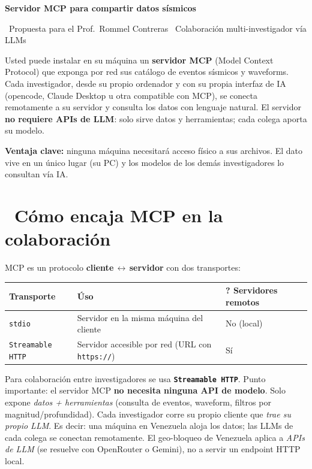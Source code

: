 \documentclass[11pt,a4paper]{article}
\newcommand{\iconoBanda}{microchip}
\newcommand{\bandaTitulo}[3][fondoOscuro]{%
  \begin{tcolorbox}[
    enhanced,
    colback=#1, colframe=#1,
    boxrule=0pt, arc=8pt, outer arc=8pt,
    width=\linewidth,
    top=18pt, bottom=6pt, left=14pt, right=14pt,
    borderline south={3.5pt}{0pt}{cyanNeon},
  ]
    \begin{minipage}[c]{0.07\linewidth}
      \centering
      \textcolor{cyanNeon}{\fontsize{30}{30}\selectfont\faIcon{\iconoBanda}}
    \end{minipage}%
    \hspace{8pt}%
    \begin{minipage}[c]{0.88\linewidth}
      {\fontsize{20}{24}\selectfont\bfseries\color{white}#2}\par\vspace{5pt}%
      \textcolor{cyanNeon!80!white}{\small\faIcon{angle-right}~#3}%
    \end{minipage}
    \vspace{4pt}
  \end{tcolorbox}%
  \vspace{8pt}%
}
\newcommand{\iconotexto}[2]{\textcolor{cyanNeon}{\faIcon{#1}}~#2}
\begin{document}
\renewcommand{\iconoBanda}{satellite}
\bandaTitulo[verdeTurquesa]{Servidor MCP para compartir datos s\'ismicos}{Propuesta para el Prof.\ Rommel Contreras \textbullet\ Colaboraci\'on multi-investigador v\'ia LLMs}

\vspace{6pt}
\begin{tcolorbox}[tarjetaIcono, title={\faIcon{user-graduate}~Resumen para el Prof.\ Rommel}]
Usted puede instalar en su m\'aquina un \textbf{servidor MCP} (Model Context Protocol) que exponga
por red sus cat\'alogo de eventos s\'ismicos y waveforms. Cada investigador, desde su propio
ordenador y con su propia interfaz de IA (opencode, Claude Desktop u otra compatible con MCP),
se conecta remotamente a su servidor y consulta los datos con lenguaje natural. El servidor
\textbf{no requiere APIs de LLM}: solo sirve datos y herramientas; cada colega aporta su modelo.

\medskip
\textbf{Ventaja clave:} ninguna m\'aquina necesitar\'a acceso f\'isico a sus archivos. El dato
vive en un \'unico lugar (su PC) y los modelos de los dem\'as investigadores lo consultan v\'ia IA.
\end{tcolorbox}

\section{\iconotexto{brain}{C\'omo encaja MCP en la colaboraci\'on}}

MCP es un protocolo \textbf{cliente\,$\leftrightarrow$\,servidor} con dos transportes:

\begin{tcolorbox}[tarjetaDato, title={\faIcon{project-diagram}~Transportes de MCP}]
\begin{tabularx}{\linewidth}{@{}p{3.4cm}XX@{}}
\toprule
\textbf{Transporte} & \textbf{\'Uso} & \textbf{? Servidores remotos} \\
\midrule
\texttt{stdio}        & Servidor en la misma m\'aquina del cliente & No (local) \\
\texttt{Streamable HTTP} & Servidor accesible por red (URL con \texttt{https://}) & S\'i \\
\bottomrule
\end{tabularx}
\end{tcolorbox}

Para colaboraci\'on entre investigadores se usa \textbf{\texttt{Streamable HTTP}}. Punto importante:
el servidor MCP \textbf{no necesita ninguna API de modelo}. Solo expone \emph{datos + herramientas}
(consulta de eventos, waveform, filtros por magnitud/profundidad). Cada investigador corre su propio
cliente que \emph{trae su propio LLM}. Es decir: una m\'aquina en Venezuela aloja los datos; las LLMs
de cada colega se conectan remotamente. El geo-bloqueo de Venezuela aplica a \emph{APIs de LLM}
(se resuelve con OpenRouter o Gemini), no a servir un endpoint HTTP local.
\end{document}
